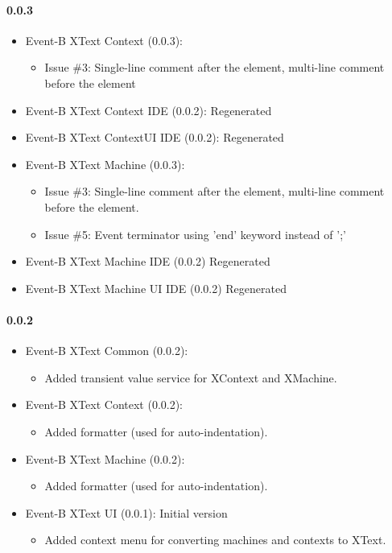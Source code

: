 \paragraph{0.0.3}
\begin{itemize}
\item Event-B XText Context (0.0.3):
  \begin{itemize}
  \item Issue \#3: Single-line comment after the element, multi-line comment before
    the element
  \end{itemize}

\item Event-B XText Context IDE (0.0.2): Regenerated
 
\item Event-B XText ContextUI IDE (0.0.2): Regenerated

\item Event-B XText Machine (0.0.3):
  \begin{itemize}
  \item Issue \#3: Single-line comment after the element, multi-line comment before
    the element.

  \item Issue \#5: Event terminator using 'end' keyword instead of ';'
  \end{itemize}

\item Event-B XText Machine IDE (0.0.2) Regenerated
  
\item Event-B XText Machine UI IDE (0.0.2) Regenerated
\end{itemize}


\paragraph{0.0.2}
\begin{itemize}
\item Event-B XText Common (0.0.2):
  \begin{itemize}
  \item Added transient value service for XContext and XMachine.
  \end{itemize}

\item Event-B XText Context (0.0.2):
  \begin{itemize}
  \item Added formatter (used for auto-indentation).
  \end{itemize}

\item Event-B XText Machine (0.0.2):
  \begin{itemize}
  \item Added formatter (used for auto-indentation).
  \end{itemize}

\item Event-B XText UI (0.0.1): Initial version
  \begin{itemize}
  \item Added context menu for converting machines and contexts to XText.
  \end{itemize}
\end{itemize}

